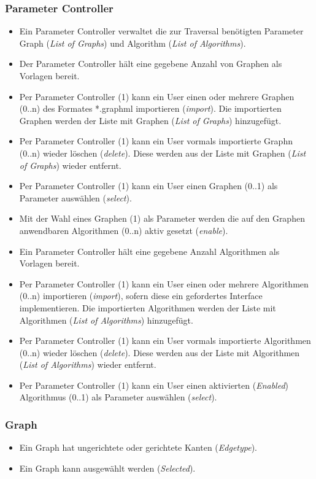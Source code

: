 \subsubsection{Parameter Controller}
\label{subsubsec:Parameter Controller}
\begin{itemize}
  \item Ein Parameter Controller verwaltet die zur Traversal ben\"otigten Parameter Graph (\textit{List of Graphs}) und Algorithm (\textit{List of Algorithms}).
  \item Der Parameter Controller h\"alt eine gegebene Anzahl von Graphen als Vorlagen bereit.
  \item Per Parameter Controller (1) kann ein User einen oder mehrere Graphen (0..n) des Formates *.graphml importieren (\textit{import}). Die importierten Graphen werden der Liste mit Graphen (\textit{List of Graphs}) hinzugef\"ugt.
  \item Per Parameter Controller (1) kann ein User vormals importierte Graphn (0..n) wieder l\"oschen (\textit{delete}). Diese werden aus der Liste mit Graphen (\textit{List of Graphs}) wieder entfernt.
  \item Per Parameter Controller (1) kann ein User einen Graphen (0..1) als Parameter ausw\"ahlen (\textit{select}).
  \item Mit der Wahl eines Graphen (1) als Parameter werden die auf den Graphen anwendbaren Algorithmen (0..n) aktiv gesetzt (\textit{enable}).
  \item Ein Parameter Controller h\"alt eine gegebene Anzahl Algorithmen als Vorlagen bereit.
  \item Per Parameter Controller (1) kann ein User einen oder mehrere Algorithmen (0..n) importieren (\textit{import}), sofern diese ein gefordertes Interface implementieren. Die importierten Algorithmen werden der Liste mit Algorithmen (\textit{List of Algorithms}) hinzugef\"ugt.
  \item Per Parameter Controller (1) kann ein User vormals importierte Algorithmen (0..n) wieder l\"oschen (\textit{delete}). Diese werden aus der Liste mit Algorithmen (\textit{List of Algorithms}) wieder entfernt.
  \item Per Parameter Controller (1) kann ein User einen aktivierten (\textit{Enabled}) Algorithmus (0..1) als Parameter ausw\"ahlen (\textit{select}).
\end{itemize}
% 
\subsubsection{Graph}
\label{subsubsec:Graph}
\begin{itemize}
  \item Ein Graph hat ungerichtete oder gerichtete Kanten (\textit{Edgetype}).
  \item Ein Graph kann ausgew\"ahlt werden (\textit{Selected}).
\end{itemize}
% 
